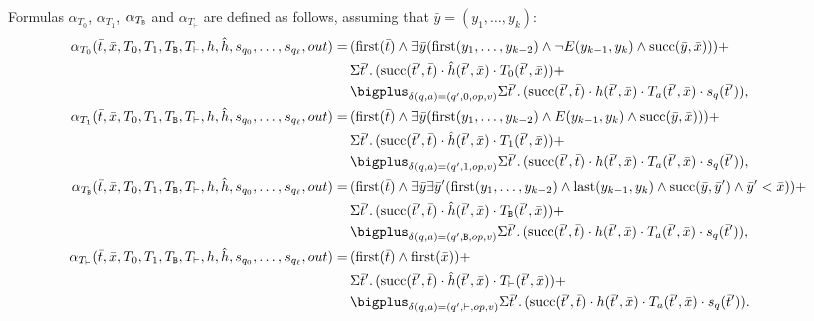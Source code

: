 Formulas $\alpha_{T_0}$, $\alpha_{T_1}$, $\alpha_{T_{\mathtt{B}}}$ and $\alpha_{T_{\vdash}}$ are defined as follows, assuming that $\bar y = (y_1, \ldots, y_k)$:
\begin{align*}
\alpha_{T_0}(\bar{t},\bar{x},T_0,T_1,T_{\ttB},T_{\vdash},h,\hat{h},s_{q_0},\ldots,s_{q_{\ell}},out) = \,&(\first(\bar{t}) \wedge \exists\bar{y}(\first(y_1,\ldots,y_{k-2})\wedge\neg E(y_{k-1},y_k) \wedge \successor(\bar{y},\bar{x}) ))+ \\
&\sa{\bar{t}'}(\successor(\bar{t}',\bar{t}) \mult \hat{h}(\bar{t}',\bar{x}) \mult T_0(\bar{t}',\bar{x})) + \\
&\bigplus_{\delta(q,a) = (q',0,op,v)}\sa{\bar{t}'}(\successor(\bar{t}',\bar{t}) \mult h(\bar{t}',\bar{x}) \mult T_a(\bar{t}',\bar{x}) \mult s_{q}(\bar{t}')),\\
\alpha_{T_1}(\bar{t},\bar{x},T_0,T_1,T_{\ttB},T_{\vdash},h,\hat{h},s_{q_0},\ldots,s_{q_{\ell}},out) = \,&(\first(\bar{t}) \wedge \exists\bar{y}(\first(y_1,\ldots,y_{k-2})\wedge E(y_{k-1},y_k) \wedge \successor(\bar{y},\bar{x}) ))+ \\
&\sa{\bar{t}'}(\successor(\bar{t}',\bar{t}) \mult \hat{h}(\bar{t}',\bar{x}) \mult T_1(\bar{t}',\bar{x})) + \\
&\bigplus_{\delta(q,a) = (q',1,op,v)}\sa{\bar{t}'}(\successor(\bar{t}',\bar{t}) \mult h(\bar{t}',\bar{x}) \mult T_a(\bar{t}',\bar{x}) \mult s_{q}(\bar{t}')),\\
\alpha_{T_{\ttB}}(\bar{t},\bar{x},T_0,T_1,T_{\ttB},T_{\vdash},h,\hat{h},s_{q_0},\ldots,s_{q_{\ell}},out) = \,&(\first(\bar{t})\wedge\exists\bar{y}\exists\bar{y}'(\first(y_1,\ldots,y_{k-2})\wedge\last(y_{k-1},y_k)\wedge\successor(\bar{y},\bar{y}')\wedge\bar{y}' < \bar{x})) + \\
&\sa{\bar{t}'}(\successor(\bar{t}',\bar{t}) \mult \hat{h}(\bar{t}',\bar{x}) \mult T_{\ttB}(\bar{t}',\bar{x})) + \\
&\bigplus_{\delta(q,a) = (q',{\ttB},op,v)}\sa{\bar{t}'}(\successor(\bar{t}',\bar{t}) \mult h(\bar{t}',\bar{x}) \mult T_a(\bar{t}',\bar{x}) \mult s_{q}(\bar{t}')),\\
\alpha_{T_{\vdash}}(\bar{t},\bar{x},T_0,T_1,T_{\ttB},T_{\vdash},h,\hat{h},s_{q_0},\ldots,s_{q_{\ell}},out) = \,&(\first(\bar{t}) \wedge \first(\bar{x})) + \\
&\sa{\bar{t}'}(\successor(\bar{t}',\bar{t}) \mult \hat{h}(\bar{t}',\bar{x}) \mult T_{\vdash}(\bar{t}',\bar{x})) + \\
&\bigplus_{\delta(q,a) = (q',\vdash,op,v)}\sa{\bar{t}'}(\successor(\bar{t}',\bar{t}) \mult h(\bar{t}',\bar{x}) \mult T_a(\bar{t}',\bar{x}) \mult s_{q}(\bar{t}')).
\end{align*}
